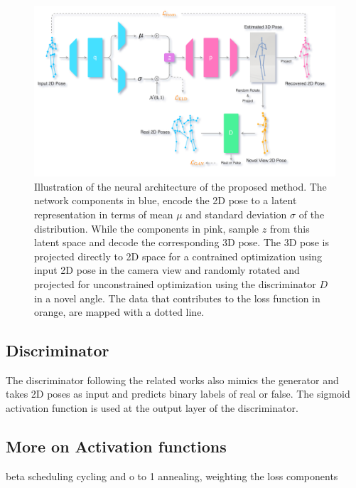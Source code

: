 \begin{figure}[h]
    \centering
    \includegraphics[width=\textwidth]{figures/arch/method_arch.png}
    \caption{Illustration of the neural architecture of the proposed method. The network components in blue, encode the 2D pose to a latent representation in terms of mean $\mu$ and standard deviation $\sigma$ of the distribution. While the components in pink, sample $z$ from this latent space and decode the corresponding 3D pose. The 3D pose is projected directly to 2D space for a contrained optimization using input 2D pose in the camera view and randomly rotated and projected for unconstrained optimization using the discriminator $D$ in a novel angle. The data that contributes to the loss function in orange, are mapped with a dotted line.  
    }
    \label{fig:method_arch}
\end{figure}


\subsection{Discriminator}%
The discriminator following the related works also mimics the generator and takes 2D poses as input and predicts binary labels of real or false. The sigmoid activation function is used at the output layer of the discriminator.

\subsection{More on Activation functions}
beta scheduling cycling and o to 1 annealing, weighting the loss components

